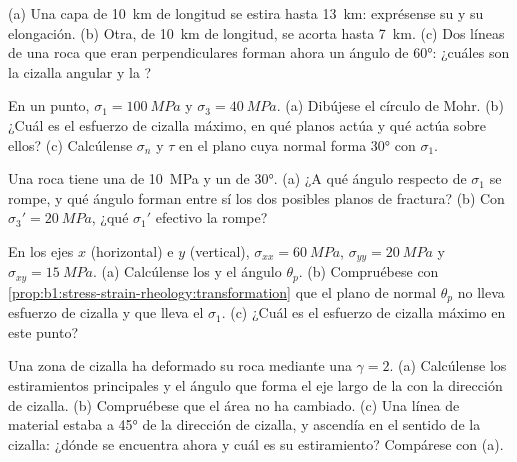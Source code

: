 \begin{exercise}[$\star$]\label{exo:b1:stress-strain-rheology:2}
(a) Una capa de \qty{10}{km} de longitud se estira hasta \qty{13}{km}: exprésense su  y su elongación. (b) Otra,
de \qty{10}{km} de longitud, se acorta hasta \qty{7}{km}. (c) Dos líneas de una roca que eran perpendiculares forman ahora
un ángulo de \ang{60}: ¿cuáles son la cizalla angular y la ?
\end{exercise}

\begin{exercise}[$\star$]\label{exo:b1:stress-strain-rheology:3}
En un punto, $\sigma_1 = \qty{100}{MPa}$ y $\sigma_3 = \qty{40}{MPa}$. (a) Dibújese el círculo de Mohr. (b) ¿Cuál es el
esfuerzo de cizalla máximo, en qué planos actúa y qué  actúa sobre ellos? (c) Calcúlense $\sigma_n$ y $\tau$
en el plano cuya normal forma \ang{30} con $\sigma_1$.
\end{exercise}

\begin{exercise}[$\star$]\label{exo:b1:stress-strain-rheology:4}
Una roca tiene una  de \qty{10}{MPa} y un  de \ang{30}. (a) ¿A qué ángulo respecto de
$\sigma_1$ se rompe, y qué ángulo forman entre sí los dos posibles planos de fractura? (b) Con
$\sigma_3' = \qty{20}{MPa}$, ¿qué $\sigma_1'$ efectivo la rompe?
\end{exercise}

\begin{exercise}[$\star\star$]\label{exo:b1:stress-strain-rheology:5}
En los ejes $x$ (horizontal) e $y$ (vertical), $\sigma_{xx} = \qty{60}{MPa}$, $\sigma_{yy} = \qty{20}{MPa}$ y
$\sigma_{xy} = \qty{15}{MPa}$. (a) Calcúlense los  y el ángulo $\theta_p$. (b) Compruébese con
\cref{prop:b1:stress-strain-rheology:transformation} que el plano de normal $\theta_p$ no lleva esfuerzo de cizalla y que
lleva el  $\sigma_1$. (c) ¿Cuál es el esfuerzo de cizalla máximo en este punto?
\end{exercise}

\begin{exercise}[$\star\star$]\label{exo:b1:stress-strain-rheology:6}
Una zona de cizalla ha deformado su roca mediante una  $\gamma = 2$. (a) Calcúlense los estiramientos
principales y el ángulo que forma el eje largo de la  con la dirección de cizalla. (b) Compruébese que
el área no ha cambiado. (c) Una línea de material estaba a \ang{45} de la dirección de cizalla, y ascendía en el sentido de
la cizalla: ¿dónde se encuentra ahora y cuál es su estiramiento? Compárese con (a).
\end{exercise}

